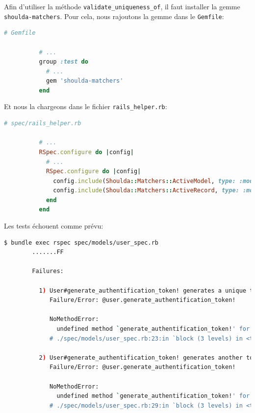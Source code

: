 \documentclass[]{report}
\begin{document}
      \begin{tcolorbox}
        Afin d’utiliser la méthode \verb|validate_uniqueness_of|, il faut installer la gemme \verb|shoulda-matchers|. Pour cela, nous rajoutons la gemme dans le \verb|Gemfile|:

        \begin{scriptsize}
          \begin{lstlisting}[language=ruby]
          # Gemfile

          # ...
          group :test do
            # ...
            gem 'shoulda-matchers'
          end
          \end{lstlisting}
        \end{scriptsize}

        Et nous la chargeons dans le fichier \verb|rails_helper.rb|:

        \begin{scriptsize}
          \begin{lstlisting}[language=ruby]
          # spec/rails_helper.rb

          # ...
          RSpec.configure do |config|
            # ...
            RSpec.configure do |config|
              config.include(Shoulda::Matchers::ActiveModel, type: :model)
              config.include(Shoulda::Matchers::ActiveRecord, type: :model)
            end
          end
          \end{lstlisting}
        \end{scriptsize}
      \end{tcolorbox}

      Les tests échouent comme prévu:

      \begin{scriptsize}
        \begin{lstlisting}[language=bash]
        $ bundle exec rspec spec/models/user_spec.rb
        .......FF

        Failures:

          1) User#generate_authentification_token! generates a unique token
             Failure/Error: @user.generate_authentification_token!

             NoMethodError:
               undefined method `generate_authentification_token!' for #<User:0x0000558948d23760>
             # ./spec/models/user_spec.rb:23:in `block (3 levels) in <top (required)>'

          2) User#generate_authentification_token! generates another token when one already has been taken
             Failure/Error: @user.generate_authentification_token!

             NoMethodError:
               undefined method `generate_authentification_token!' for #<User:0x0000558948d18720>
             # ./spec/models/user_spec.rb:29:in `block (3 levels) in <top (required)>'
        \end{lstlisting}
      \end{scriptsize}
\end{document}
